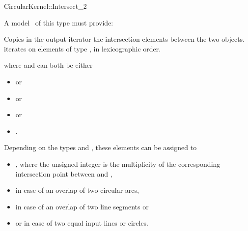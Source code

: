 \begin{ccRefFunctionObjectConcept}{CircularKernel::Intersect_2}

\ccRefines



A model \ccVar\ of this type must provide:

{Copies in the output iterator the intersection elements between the
two objects.  iterates on
elements of type , in lexicographic order.}

where  and  can both be either
\begin{itemize}
\item {}  or
\item {}  or
\item {}  or
\item {} .
\end{itemize} 

Depending on the types  and , these elements can be
assigned to 
\begin{itemize}
\item {} ,
where the unsigned integer is the multiplicity of the corresponding
intersection point between  and ,
\item {}  in case of an overlap of 
two circular arcs,
\item {}  in case of an overlap of two 
line segments or
\item {}  or  
in case of two equal input lines or circles. 
\end{itemize} 



\end{ccRefFunctionObjectConcept}
